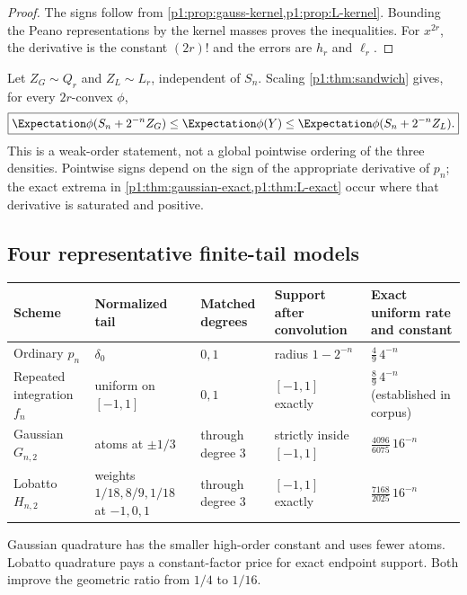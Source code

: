 \documentclass[11pt]{article}
\numberwithin{equation}{section}
\theoremstyle{definition}
\theoremstyle{remark}
\begin{document}
\begin{proof}
The signs follow from \cref{p1:prop:gauss-kernel,p1:prop:L-kernel}.  Bounding the Peano representations by the kernel masses proves the inequalities.  For $x^{2r}$, the derivative is the constant $(2r)!$ and the errors are $h_r$ and $\ell_r$.
\end{proof}

Let $Z_G\sim Q_r$ and $Z_L\sim L_r$, independent of $S_n$.  Scaling \cref{p1:thm:sandwich} gives, for every $2r$-convex $\phi$,
\begin{equation}
 \boxed{
 \Expectation\phi(S_n+2^{-n}Z_G)
 \le \Expectation\phi(Y)
 \le \Expectation\phi(S_n+2^{-n}Z_L).}
 \label{p1:eq:full-sandwich}
\end{equation}
This is a weak-order statement, not a global pointwise ordering of the three densities.  Pointwise signs depend on the sign of the appropriate derivative of $p_n$; the exact extrema in \cref{p1:thm:gaussian-exact,p1:thm:L-exact} occur where that derivative is saturated and positive.

\subsection{Four representative finite-tail models}

\begin{center}
\begin{tabularx}{0.98\textwidth}{@{}p{}p{}p{}p{}X@{}}
\toprule
Scheme & Normalized tail & Matched degrees & Support after convolution & Exact uniform rate and constant\\
\midrule
Ordinary $p_n$ & $\delta_0$ & $0,1$ & radius $1-2^{-n}$ & \(\frac49\,4^{-n}\)\\
Repeated integration $f_n$ & uniform on $[-1,1]$ & $0,1$ & $[-1,1]$ exactly & \(\frac89\,4^{-n}\) (established in corpus)\\
Gaussian $G_{n,2}$ & atoms at $\pm1/3$ & through degree $3$ & strictly inside $[-1,1]$ & \(\frac{4096}{6075}\,16^{-n}\)\\
Lobatto $H_{n,2}$ & weights $1/18,8/9,1/18$ at $-1,0,1$ & through degree $3$ & $[-1,1]$ exactly & \(\frac{7168}{2025}\,16^{-n}\)\\
\bottomrule
\end{tabularx}
\end{center}

Gaussian quadrature has the smaller high-order constant and uses fewer atoms.  Lobatto quadrature pays a constant-factor price for exact endpoint support.  Both improve the geometric ratio from $1/4$ to $1/16$.
\end{document}
